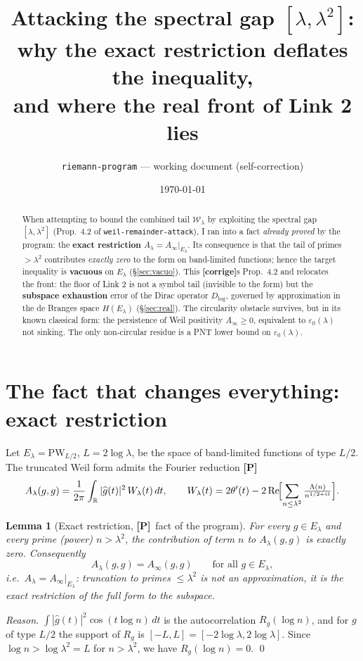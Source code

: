\documentclass[11pt]{article}
\title{\textbf{Attacking the spectral gap $[\lambda,\lambda^2]$:\\
why the exact restriction deflates the inequality,\\
and where the real front of Link 2 lies}}
\author{\texttt{riemann-program} --- working document (self-correction)}
\date{\today}
\newcommand{\PR}{\textcolor{green!55!black}{\textbf{[P]}}}
\newcommand{\RETRACT}{\textcolor{orange!85!black}{\textbf{[corrige]}}}
\theoremstyle{plain}
\newtheorem{lemma}{Lemma}
\theoremstyle{definition}
\newcommand{\R}{\mathbb{R}}
\newcommand{\Lam}{\Lambda}
\DeclareMathOperator{\Real}{Re}
\newcommand{\El}{E_\lambda}
\newcommand{\PW}{\mathrm{PW}}
\begin{document}
\maketitle

\begin{abstract}
When attempting to bound the combined tail $\mathcal W_\lambda$ by exploiting the
spectral gap $[\lambda,\lambda^2]$ (Prop.\ 4.2 of \texttt{weil-remainder-attack}),
I ran into a fact \emph{already proved} by the program: the \textbf{exact
restriction} $A_\lambda=A_\infty|_{\El}$. Its consequence is that the tail of
primes $>\lambda^2$ contributes \emph{exactly zero} to the form on band-limited
functions; hence the target inequality is \textbf{vacuous} on $\El$
(\S\ref{sec:vacuo}). This \RETRACT{}s Prop.\ 4.2 and relocates the front: the floor
of Link 2 is not a symbol tail (invisible to the form) but the \textbf{subspace
exhaustion} error of the Dirac operator $D_{\log}$, governed by approximation in
the de Branges space $H(\El)$ (\S\ref{sec:real}). The circularity obstacle
survives, but in its known classical form: the persistence of Weil positivity
$A_\infty\ge0$, equivalent to $\varepsilon_0(\lambda)$ not sinking. The only
non-circular residue is a PNT lower bound on $\varepsilon_0(\lambda)$.
\end{abstract}

\tableofcontents

\section{The fact that changes everything: exact restriction}\label{sec:vacuo}

Let $\El=\PW_{L/2}$, $L=2\log\lambda$, be the space of band-limited functions of
type $L/2$. The truncated Weil form admits the Fourier reduction \PR
\[
  A_\lambda(g,g)=\frac1{2\pi}\int_\R|\widehat g(t)|^2\,W_\lambda(t)\,dt,
  \qquad
  W_\lambda(t)=2\theta'(t)-2\Real\!\Bigl[\sum_{n\le\lambda^2}\tfrac{\Lam(n)}{n^{1/2+it}}\Bigr].
\]

\begin{lemma}[Exact restriction, \PR\ fact of the program]\label{lem:exact}
For every $g\in\El$ and every prime (power) $n>\lambda^2$, the contribution of
term $n$ to $A_\lambda(g,g)$ is \emph{exactly zero}. Consequently
\[
  A_\lambda(g,g)=A_\infty(g,g)\qquad\text{for all }g\in\El,
\]
i.e.\ $A_\lambda=A_\infty|_{\El}$: truncation to primes $\le\lambda^2$ \emph{is not
an approximation}, it is the exact restriction of the full form to the subspace.
\end{lemma}
\begin{proof}[Reason]
$\int|\widehat g(t)|^2\cos(t\log n)\,dt$ is the autocorrelation $R_g(\log n)$, and
for $g$ of type $L/2$ the support of $R_g$ is $[-L,L]=[-2\log\lambda,2\log\lambda]$.
Since $\log n>\log\lambda^2=L$ for $n>\lambda^2$, we have $R_g(\log n)=0$. \qed
\end{proof}
\end{document}
